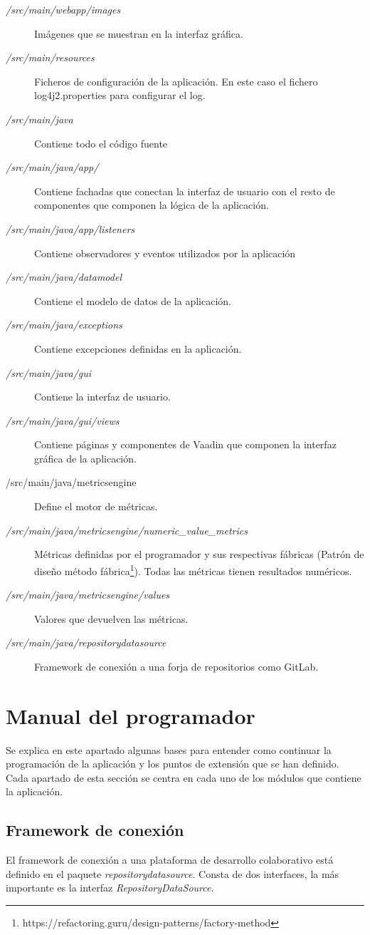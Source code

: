 \begin{description}
	\item[\textit{/src/main/webapp/images}] Imágenes que se muestran en la interfaz gráfica.
	\item[\textit{/src/main/resources}] Ficheros de configuración de la aplicación. En este caso el fichero log4j2.properties para configurar el log.
	\item[\textit{/src/main/java}] Contiene todo el código fuente
	\item[\textit{/src/main/java/app/}] Contiene fachadas que conectan la interfaz de usuario con el resto de componentes que componen la lógica de la aplicación.
	\item[\textit{/src/main/java/app/listeners}] Contiene observadores y eventos utilizados por la aplicación
	\item[\textit{/src/main/java/datamodel}] Contiene el modelo de datos de la aplicación.
	\item[\textit{/src/main/java/exceptions}] Contiene excepciones definidas en la aplicación.
	\item[\textit{/src/main/java/gui}] Contiene la interfaz de usuario.
	\item[\textit{/src/main/java/gui/views}] Contiene páginas y componentes de Vaadin que componen la interfaz gráfica de la aplicación.
	\item[/src/main/java/metricsengine] Define el motor de métricas.
	\item[\textit{/src/main/java/metricsengine/numeric\_value\_metrics}] Métricas definidas por el programador y sus respectivas fábricas (Patrón de diseño método fábrica\footnote{https://refactoring.guru/design-patterns/factory-method}). Todas las métricas tienen resultados numéricos.
	\item[\textit{/src/main/java/metricsengine/values}] Valores que devuelven las métricas.
	\item[\textit{/src/main/java/repositorydatasource}] Framework de conexión a una forja de repositorios como GitLab.
\end{description}
\section{Manual del programador}
Se explica en este apartado algunas bases para entender como continuar la programación de la aplicación y los puntos de extensión que se han definido.
Cada apartado de esta sección se centra en cada uno de los módulos que contiene la aplicación.
\subsection{Framework de conexión}
El framework de conexión a una plataforma de desarrollo colaborativo está definido en el paquete \textit{repositorydatasource}. Consta de dos interfaces, la más importante es la interfaz \textit{RepositoryDataSource}.
